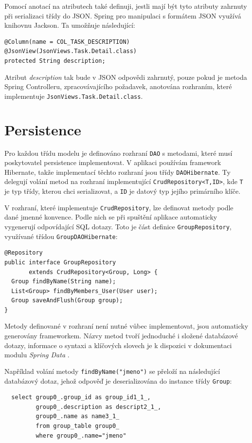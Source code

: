 \documentclass[thesis=B,czech]{FITthesis}[2012/06/26]
\begin{document}
		Pomocí anotací na atributech také definuji, jestli mají být tyto atributy zahrnuty při serializaci třídy do JSON. Spring pro manipulaci s formátem JSON využívá knihovnu Jackson. Ta umožňuje následující:
		\begin{Verbatim}
@Column(name = COL_TASK_DESCRIPTION)
@JsonView(JsonViews.Task.Detail.class)
protected String description;
		\end{Verbatim}
		Atribut \textit{description} tak bude v JSON odpovědi zahrnutý, pouze pokud je metoda Spring Controlleru, zpracovávajícího požadavek, anotována rozhraním, které implementuje \texttt{JsonViews.\allowbreak Task.\allowbreak Detail.\allowbreak class}.
	
		
		
	\section{Persistence}
		Pro každou třídu modelu je definováno rozhraní \texttt{DAO} s metodami, které musí poskytovatel persistence implementovat. V aplikaci používám framework Hibernate, takže implementací těchto rozhraní jsou třídy \texttt{DAOHibernate}. Ty delegují volání metod na rozhraní implementující \texttt{CrudRepository<T,ID>}, kde \texttt{T} je typ třídy, kterou chci serializovat, a \texttt{ID} je datový typ jejího primárního klíče.
		
		V rozhraní, které implementuje \texttt{CrudRepository}, lze definovat metody podle dané jmenné konvence. Podle nich se při spuštění aplikace automaticky vygenerují odpovídající SQL dotazy. Toto je část definice \texttt{GroupRepository}, využívané třídou \texttt{GroupDAOHibernate}:
		\begin{Verbatim}
@Repository
public interface GroupRepository 
       extends CrudRepository<Group, Long> {
  Group findByName(String name);
  List<Group> findByMembers_User(User user);
  Group saveAndFlush(Group group);
}
		\end{Verbatim}
		
	Metody definované v rozhraní není nutné vůbec implementovat, jsou automaticky generovány frameworkem. Názvy metod tvoří jednoduché i složené databázové dotazy, informace o syntaxi a klíčových slovech je k dispozici v dokumentaci modulu \textit{Spring Data} \cite{dao-query-methods}.
	
	Například volání metody \texttt{findByName("jmeno")} se přeloží na následující databázový dotaz, jehož odpověď je deserializována do instance třídy \texttt{Group}:
	\begin{Verbatim}
  select group0_.group_id as group_id1_1_, 
         group0_.description as descript2_1_, 
         group0_.name as name3_1_ 
         from group_table group0_ 
         where group0_.name="jmeno"
	\end{Verbatim}
	
\end{document}
